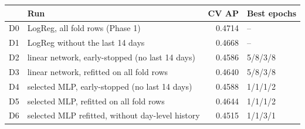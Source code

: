 \begin{tabular}{llrl}
\toprule
 & Run & CV AP & Best epochs \\
\midrule
D0 & LogReg, all fold rows (Phase 1) & 0.4714 & -- \\
D1 & LogReg without the last 14 days & 0.4668 & -- \\
D2 & linear network, early-stopped (no last 14 days) & 0.4586 & 5/8/3/8 \\
D3 & linear network, refitted on all fold rows & 0.4640 & 5/8/3/8 \\
D4 & selected MLP, early-stopped (no last 14 days) & 0.4588 & 1/1/1/2 \\
D5 & selected MLP, refitted on all fold rows & 0.4644 & 1/1/1/2 \\
D6 & selected MLP refitted, without day-level history & 0.4515 & 1/1/3/1 \\
\bottomrule
\end{tabular}
